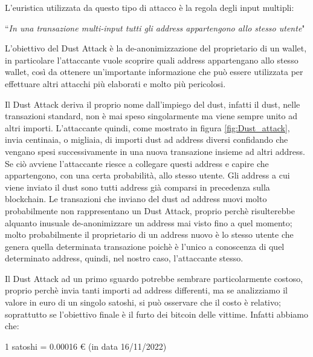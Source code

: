 L'euristica utilizzata da questo tipo di attacco è la regola degli input multipli:
\begin{center}
    ``\textit{In una transazione multi-input tutti gli address appartengono allo stesso utente}"
\end{center}
L'obiettivo del Dust Attack è la de-anonimizzazione del proprietario di un wallet, in particolare l'attaccante vuole scoprire quali address appartengano allo stesso wallet, così da ottenere un'importante informazione che può essere utilizzata per effettuare altri attacchi più elaborati e molto più pericolosi.

Il Dust Attack deriva il proprio nome dall'impiego del dust, infatti il dust, nelle transazioni standard, non è mai speso singolarmente ma viene sempre unito ad altri importi. L'attaccante quindi, come mostrato in figura \ref{fig:Dust_attack}, invia centinaia, o migliaia, di importi dust ad address diversi confidando che vengano spesi successivamente in una nuova transazione insieme ad altri address. Se ciò avviene l'attaccante riesce a collegare questi address e capire che appartengono, con una certa probabilità, allo stesso utente. Gli address a cui viene inviato il dust sono tutti address già comparsi in precedenza sulla blockchain. Le transazioni che inviano del dust ad address nuovi  molto probabilmente non rappresentano un Dust Attack, proprio perchè risulterebbe alquanto inusuale de-anonimizzare un address mai visto fino a quel momento; molto probabilmente il proprietario di un address nuovo è lo stesso utente che genera quella determinata transazione poichè è l'unico a conoscenza di quel determinato address, quindi, nel nostro caso, l'attaccante stesso.

Il Dust Attack ad un primo sguardo potrebbe sembrare particolarmente costoso, proprio perchè invia tanti importi ad address differenti, ma se analizziamo il valore in euro di un singolo satoshi, si può osservare che il costo è relativo; soprattutto se l'obiettivo finale è il furto dei bitcoin delle vittime. Infatti abbiamo che:
\begin{center}
    1 satoshi = 0.00016 € (in data 16/11/2022) 
\end{center}


